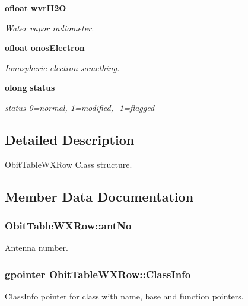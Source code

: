 \begin{CompactItemize}
{\bf ofloat} {\bf wvr\-H2O}
\begin{CompactList}\small\item\em Water vapor radiometer. \item\end{CompactList}\item 
{\bf ofloat} {\bf onos\-Electron}
\begin{CompactList}\small\item\em Ionospheric electron something. \item\end{CompactList}\item 
{\bf olong} {\bf status}
\begin{CompactList}\small\item\em status 0=normal, 1=modified, -1=flagged \item\end{CompactList}\end{CompactItemize}


\subsection{Detailed Description}
Obit\-Table\-WXRow Class structure. 



\subsection{Member Data Documentation}
\subsubsection{ {\bf Obit\-Table\-WXRow::ant\-No}}\label{structObitTableWXRow_o8}


Antenna number. 

\subsubsection{\setlength{\rightskip}{0pt plus 5cm}gpointer {\bf Obit\-Table\-WXRow::Class\-Info}}\label{structObitTableWXRow_o1}


Class\-Info pointer for class with name, base and function pointers. 

